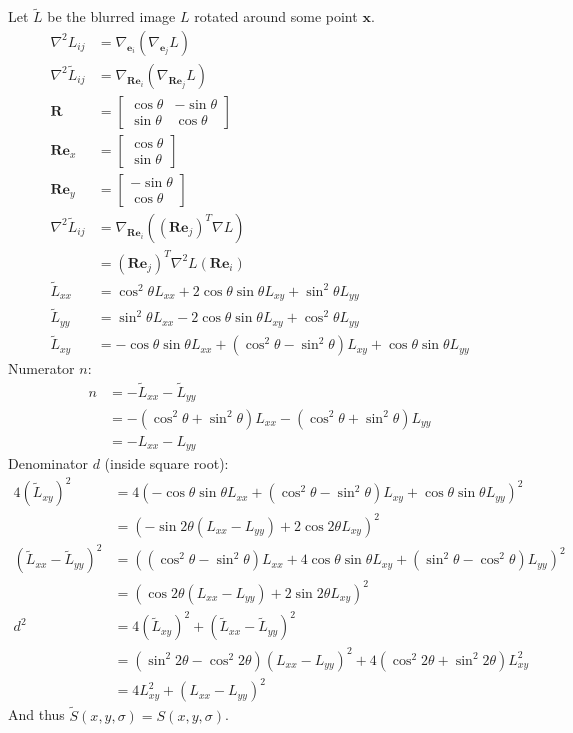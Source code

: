 \documentclass[thesis.tex]{subfiles}
\begin{document}
Let $\widetilde{L}$ be the blurred image $L$ rotated around some point $\mathbf{x}$. 
\begin{align}
\nabla^2 L_{ij} &= \nabla_{\mathbf{e}_i} (\nabla_{\mathbf{e}_j} L) \\
\nabla^2 \widetilde{L}_{ij} &= \nabla_{\mathbf{Re}_i} (\nabla_{\mathbf{Re}_j} L) \\
\mathbf{R} &= \begin{bmatrix}
\cos \theta & -\sin \theta \\
\sin \theta & \cos \theta
\end{bmatrix} \\
\mathbf{Re}_x &= \begin{bmatrix}
\cos \theta \\ \sin \theta
\end{bmatrix} \\
\mathbf{Re}_y &= \begin{bmatrix}
-\sin \theta \\ \cos \theta
\end{bmatrix} \\
\nabla^2 \widetilde{L}_{ij}
&= \nabla_{\mathbf{Re}_i} \left( (\mathbf{Re}_j)^T \nabla L \right) \\
&= (\mathbf{Re}_j)^T \nabla^2 L (\mathbf{Re}_i) \\
\widetilde{L}_{xx} &= \cos^2 \theta L_{xx} + 2 \cos \theta \sin \theta L_{xy} + \sin^2 \theta L_{yy} \\
\widetilde{L}_{yy} &= \sin^2 \theta L_{xx} - 2 \cos \theta \sin \theta L_{xy} + \cos^2 \theta L_{yy} \\
\widetilde{L}_{xy} &= -\cos \theta \sin \theta L_{xx} + (\cos^2 \theta - \sin^2 \theta) L_{xy} + \cos \theta \sin \theta L_{yy}
\end{align}
%
Numerator $n$:
%
\begin{align}
n &= - \widetilde{L}_{xx} - \widetilde{L}_{yy} \\
&= -(\cos^2 \theta + \sin^2 \theta)  L_{xx} - (\cos^2 \theta + \sin^2 \theta) L_{yy} \\
&= -L_{xx} - L_{yy}
\end{align}
%
Denominator $d$ (inside square root):
%
\begin{align}
4(\widetilde{L}_{xy})^2 &= 4(-\cos \theta \sin \theta L_{xx} + (\cos^2 \theta - \sin^2 \theta) L_{xy} + \cos \theta \sin \theta L_{yy})^2 \\
&= (- \sin 2\theta (L_{xx} - L_{yy}) + 2 \cos 2\theta L_{xy})^2 \\
(\widetilde{L}_{xx} - \widetilde{L}_{yy})^2 &= ((\cos^2 \theta - \sin^2 \theta) L_{xx} + 4 \cos \theta \sin \theta L_{xy} + (\sin^2 \theta - \cos^2 \theta) L_{yy})^2 \\
&= (\cos 2\theta (L_{xx} - L_{yy}) + 2 \sin 2\theta L_{xy})^2 \\
d^2 &= 4(\widetilde{L}_{xy})^2 + (\widetilde{L}_{xx} - \widetilde{L}_{yy})^2 \\
&= (\sin^2 2\theta - \cos^2 2\theta) (L_{xx} - L_{yy})^2 + 4 (\cos^2 2\theta + \sin^2 2\theta) L_{xy}^2 \\
&= 4 L_{xy}^2 + (L_{xx} - L_{yy})^2
\end{align}
%
And thus $\widetilde{S}(x,y,\sigma) = S(x,y,\sigma)$.
%
\end{document}
